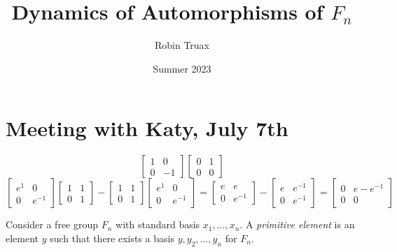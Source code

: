 \documentclass[12pt]{article}
\title{Dynamics of Automorphisms of $F_n$}
\author{Robin Truax}
\date{Summer 2023}
\begin{document}
\maketitle
\tableofcontents

\section{Meeting with Katy, July 7th}
\begin{equation*}
    \begin{bmatrix}
        1 & 0 \\
        0 & -1
    \end{bmatrix}
    \begin{bmatrix}
        0 & 1 \\
        0 & 0
    \end{bmatrix}
\end{equation*}
\begin{equation*}
\left[\begin{matrix}
        e^{1} & 0       \\
        0     & e^{- 1}
    \end{matrix}\right]
\left[\begin{matrix}
        1 & 1 \\
        0 & 1
    \end{matrix}\right]
    - 
\left[\begin{matrix}
        1 & 1 \\
        0 & 1
    \end{matrix}\right]
\left[\begin{matrix}
        e^{1} & 0       \\
        0     & e^{- 1}
    \end{matrix}\right]
    = \begin{bmatrix}
    e & e      \\
    0 & e^{-1}
\end{bmatrix}
 - 
\begin{bmatrix}
    e & e^{-1} \\
    0 & e^{-1}
\end{bmatrix}
= \begin{bmatrix}
    0 & e - e^{-1} \\
    0 & 0
\end{bmatrix}
\end{equation*}

\begin{definition}\label{def:Primitive_Elements}
    Consider a free group $F_n$ with standard basis $x_1, \ldots, x_n$. A \emph{primitive element} is an element $y$ such that there exists a basis $y, y_2, \ldots, y_n$ for $F_n$. 
\end{definition}
\end{document}
